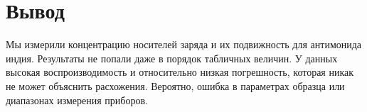 \documentclass[a4paper]{article}
\begin{document}
\section{Вывод}
Мы измерили концентрацию носителей заряда и их подвижность для антимонида индия. Результаты не попали даже в порядок табличных величин. У данных высокая воспроизводимость и относительно низкая погрешность, которая никак не может объяснить расхожения. Вероятно, ошибка в параметрах образца или диапазонах измерения приборов.
\end{document}

